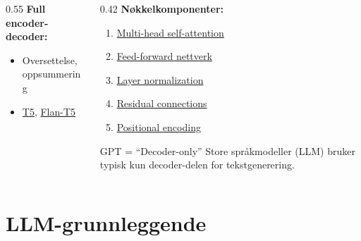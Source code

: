 \documentclass[aspectratio=169, 10pt]{beamer}
\begin{document}
\begin{frame}
\begin{columns}[T]
\begin{column}{0.55\textwidth}
            \vspace{0.2cm}
            \textbf{Full encoder-decoder:}
            \begin{itemize}
                \item Oversettelse, oppsummering
                \item \href{https://arxiv.org/abs/1910.10683}{T5}, \href{https://arxiv.org/abs/2210.11416}{Flan-T5}
            \end{itemize}
        \end{column}
        \begin{column}{0.42\textwidth}
            \textbf{Nøkkelkomponenter:}
            \begin{enumerate}
                \item \href{https://en.wikipedia.org/wiki/Attention_(machine_learning)\#Multi-head_attention}{Multi-head self-attention}
                \item \href{https://en.wikipedia.org/wiki/Feedforward_neural_network}{Feed-forward nettverk}
                \item \href{https://en.wikipedia.org/wiki/Layer_normalization}{Layer normalization}
                \item \href{https://en.wikipedia.org/wiki/Residual_neural_network}{Residual connections}
                \item \href{https://en.wikipedia.org/wiki/Positional_encoding}{Positional encoding}
            \end{enumerate}

            \vspace{0.2cm}
            \begin{block}{\footnotesize GPT = ``Decoder-only''}
                \footnotesize Store språkmodeller (LLM) bruker typisk kun decoder-delen for tekstgenerering.
            \end{block}
        \end{column}
    \end{columns}
\end{frame}

\section{LLM-grunnleggende}
\end{document}
